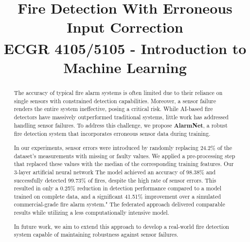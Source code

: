 \documentclass[conference]{IEEEtran}
\begin{document}
\title{Fire Detection With Erroneous Input Correction\\
{\footnotesize \textsuperscript{} ECGR 4105/5105 -
Introduction to Machine Learning} }

\author{ 
\and
{}
\and
{}
 }
\maketitle

\begin{abstract}
The accuracy of typical fire alarm
systems is often limited due to their reliance on single
sensors with constrained detection capabilities. Moreover, a
sensor failure renders the entire system ineffective, posing
a critical risk. While AI-based fire detectors have massively outperformed
traditional systems, little work has addressed handling sensor failures. 
To address this challenge, we propose \textbf{AlarmNet}, a robust fire
detection system that incorporates erroneous sensor data
during training. 

In our experiments, sensor errors were introduced by
randomly replacing 24.2\% of the dataset’s measurements with
missing or faulty values. We applied a pre-processing step
that replaced these values with the median of the
corresponding training features. Our 3-layer artificial
neural network The model achieved an accuracy of 98.38\% and
successfully detected 99.73\% of fires, despite the high
rate of sensor errors. This resulted in only a 0.25\%
reduction in detection performance compared to a model
trained on complete data, and a significant 41.51\%
improvement over a simulated commercial-grade fire alarm
system." The federated approach delivered comparable results
while utilizing a less computationally intensive model.

In future work, we aim to extend this approach to develop a
real-world fire detection system capable of maintaining
robustness against sensor failures.
\end{abstract}
\end{document}
